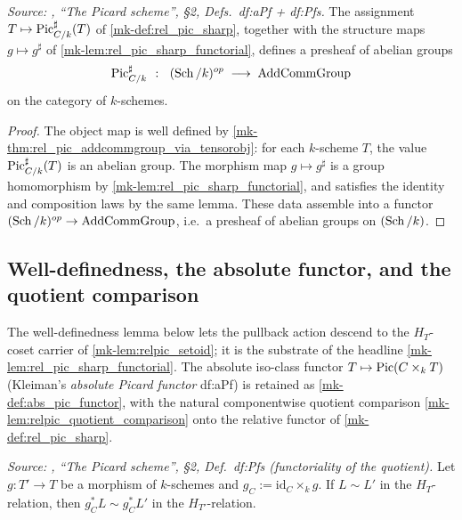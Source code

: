\begin{theorem}\label{mk-thm:rel_pic_sharp_presheaf}
  \textit{Source: \cite{kleiman-picard}, ``The Picard scheme'', \S 2,
  Defs.~df:aPf + df:Pfs.}
  The assignment \(T \mapsto \operatorname{Pic}^\sharp_{C/k}(T)\) of \ref{mk-def:rel_pic_sharp},
  together with the structure maps \(g \mapsto g^\sharp\) of
  \ref{mk-lem:rel_pic_sharp_functorial}, defines a presheaf of abelian groups
  \[
    \operatorname{Pic}^\sharp_{C/k} \;\;\colon\;\; (\operatorname{Sch}/k)^{op} \;\longrightarrow\;
                                     \mathrm{AddCommGroup}
  \]
  on the category of \(k\)-schemes.
\end{theorem}
\begin{proof}
  \leanok


The object map is well defined by
  \ref{mk-thm:rel_pic_addcommgroup_via_tensorobj}: for each \(k\)-scheme
  \(T\), the value \(\operatorname{Pic}^\sharp_{C/k}(T)\) is an abelian group. The
  morphism map \(g \mapsto g^\sharp\) is a group homomorphism by
  \ref{mk-lem:rel_pic_sharp_functorial}, and satisfies the identity and
  composition laws by the same lemma. These data assemble into a functor
  \((\operatorname{Sch}/k)^{op} \to \mathrm{AddCommGroup}\), i.e.\ a presheaf of abelian groups on
  \((\operatorname{Sch}/k)\).
\end{proof}

\subsection{Well-definedness, the absolute functor, and the quotient comparison}
\label{mk-subsec:relpic_relative_functor}

The well-definedness lemma below lets the pullback action descend to the
\(H_T\)-coset carrier of \ref{mk-lem:relpic_setoid}; it is the substrate of
the headline \ref{mk-lem:rel_pic_sharp_functorial}. The absolute iso-class
functor \(T \mapsto \operatorname{Pic}(C \times_k T)\) (Kleiman's \emph{absolute Picard
functor} df:aPf) is retained as \ref{mk-def:abs_pic_functor}, with the
natural componentwise quotient comparison
\ref{mk-lem:relpic_quotient_comparison} onto the relative functor of
\ref{mk-def:rel_pic_sharp}.

\begin{lemma}\label{mk-lem:relpic_pullback_welldef}
  \leanok

  \textit{Source: \cite{kleiman-picard}, ``The Picard scheme'', \S 2, Def.~df:Pfs
  (functoriality of the quotient).}
  Let \(g : T' \to T\) be a morphism of \(k\)-schemes and
  \(g_C := \mathrm{id}_C \times_k g\). If \(L \sim L'\) in the
  \(H_T\)-relation, then \(g_C^* L \sim g_C^* L'\) in the
  \(H_{T'}\)-relation.
\end{lemma}

